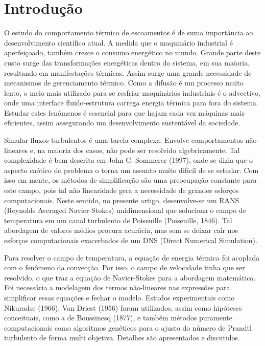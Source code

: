 \chapter{Introdução}

\noindent 

 
 	O estudo do comportamento térmico de escoamentos é de suma importância ao desenvolvimento científico atual. A medida que o maquinário industrial é aperfeiçoado, também cresce o consumo energético no mundo. Grande parte deste custo surge das transformações energéticas dentro do sistema, em sua maioria, resultando em manifestações térmicas. Assim surge uma grande necessidade de mecanismos de gerenciamento térmico. Como a difusão é um processo muito lento, o meio mais utilizado para se resfriar maquinários industriais é o advectivo, onde uma interface fluido-estrutura carrega energia térmica para fora do sistema. Estudar estes fenômenos é essencial para que hajam cada vez máquinas mais eficientes, assim assegurando um desenvolvimento sustentável da sociedade. 
 	
	Simular fluxos turbulentos é uma tarefa complexa. Envolve comportamentos não lineares e, na maioria dos casos, não pode ser resolvido algebricamente. Tal complexidade é bem descrita em John C. Sommerer (1997), onde se dizia que o aspecto caótico do problema o torna um assunto muito difícil de se estudar. Com isso em mente, os métodos de simplificação são uma preocupação constante para este campo, pois tal não linearidade gera a necessidade de grandes esforços computacionais.
	Neste sentido, no presente artigo, desenvolve-se um RANS (Reynolds Averaged Navier-Stokes) unidimensional que soluciona o campo de temperatura em um canal turbulento de Poiseuille (Poiseuille, 1846). Tal abordagem de valores médios procura acurácia, mas sem se deixar cair nos esforços computacionais exacerbados de um DNS (Direct Numerical Simulation).
	
	Para resolver o campo de temperatura, a equação de energia térmica foi acoplada com o fenômeno da convecção. Por isso, o campo de velocidade tinha que ser resolvido, o que traz a equação de Navier-Stokes para a abordagem matemática. Foi necessária a modelagem dos termos não-lineares nas expressões para simplificar essas equações e fechar o modelo.
	Estudos experimentais como Nikuradse (1966), Van Driest (1956) foram utilizados, assim como hipóteses conceituais, como a de Boussinesq (1877), e também métodos puramente computacionais como algoritmos genéticos para o ajusto do número de Prandtl turbulento de forma multi objetiva. 
	Detalhes são apresentados e discutidos.
	
